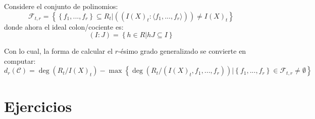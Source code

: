 \documentclass[12pt]{report}
\theoremstyle{largebreak}
\begin{document}
    Considere el conjunto de polinomios:
    \begin{equation*}
        \mathcal{F}_{ t,r}=\left\{\left\{f_1,...,f_r \right\}\subseteq R_t \Big|((I(X)_t:\langle f_1,...,f_r\rangle))\neq I(X)_t \right\}
    \end{equation*}
    donde ahora el ideal colon/cociente es:
    \begin{equation*}
        (I:J)=\left\{h\in R\Big|hJ\subseteq I \right\}
    \end{equation*}

    Con lo cual, la forma de calcular el $r$-ésimo grado generalizado se convierte en computar:
    \begin{equation*}
        d_r(\mathcal{C})=\deg\left(R_t/I(X)_t \right)-\max\left\{\deg\left(R_t/(I(X)_t,f_1,...,f_r) \right)\Big|\left\{f_1,...,f_r \right\}\in\mathcal{F}_{ t,r}\neq\emptyset \right\}
    \end{equation*}

    \newpage

    \section{Ejercicios}
\end{document}
